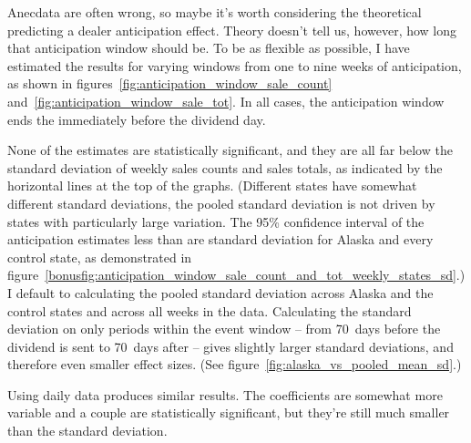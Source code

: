 \documentclass[11pt,letterpaper,oneside]{article}
\newcommand{\snippet}[1]{\hspace{-0.15em}}
\begin{document}
\begin{doublespacing}
%


Anecdata are often wrong, so maybe it's worth considering the theoretical predicting a dealer anticipation effect.
Theory doesn't tell us, however, how long that anticipation window should be.
To be as flexible as possible, I have estimated the results for varying windows from one to nine weeks of anticipation, as shown in figures~\ref{fig:anticipation_window_sale_count} and~\ref{fig:anticipation_window_sale_tot}.
In all cases, the anticipation window ends the immediately before the dividend day.

None of the estimates are statistically significant, and they are all far below the standard deviation of weekly sales counts and sales totals, as indicated by the horizontal lines at the top of the graphs.
(Different states have somewhat different standard deviations, the pooled standard deviation is not driven by states with particularly large variation.
The 95\% confidence interval of the anticipation estimates less than are standard deviation for Alaska and every control state, as demonstrated in figure~\ref{bonusfig:anticipation_window_sale_count_and_tot_weekly_states_sd}.)
I default to calculating the pooled standard deviation across Alaska and the control states and across all weeks in the data.
Calculating the standard deviation on only periods within the event window -- from 70~days before the dividend is sent to 70~days after -- gives slightly larger standard deviations, and therefore even smaller effect sizes.
(See figure~\ref{fig:alaska_vs_pooled_mean_sd}.)

Using daily data produces similar results.
The coefficients are somewhat more variable and a couple are statistically significant, but they're still much smaller than the standard deviation.



\end{doublespacing}
\end{document}

